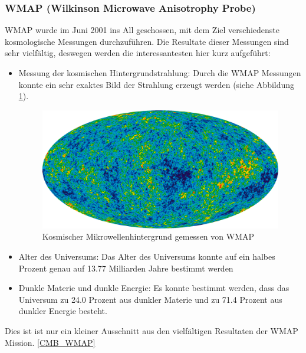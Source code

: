 \subsubsection{WMAP (Wilkinson Microwave Anisotrophy Probe)}
WMAP wurde im Juni 2001 ins All geschossen, mit dem Ziel verschiedenste 
kosmologische Messungen durchzuführen.
Die Resultate dieser Messungen sind sehr vielfältig, deswegen werden die 
interessantesten hier kurz aufgeführt:
\begin{itemize}
	\item Messung der kosmischen Hintergrundstrahlung: Durch die WMAP Messungen 
	konnte ein sehr exaktes Bild der Strahlung erzeugt werden (siehe Abbildung 
	\ref{fig:CMB_WMAP}).
	\begin{figure}
		\includegraphics[width=\linewidth]{cmb/images/CMB_WMAP.png}
		\caption{Kosmischer Mikrowellenhintergrund gemessen von WMAP}
		\label{fig:CMB_WMAP}
	\end{figure}
	\item Alter des Universums: Das Alter des Universums konnte auf ein halbes 
	Prozent genau auf 13.77 Milliarden Jahre bestimmt werden
	\item Dunkle Materie und dunkle Energie: Es konnte bestimmt werden, dass 
	das Universum zu 24.0 Prozent aus dunkler Materie und zu 71.4 Prozent aus 
	dunkler Energie besteht.
\end{itemize}
Dies ist ist nur ein kleiner Ausschnitt aus den vielfältigen Resultaten der 
WMAP Mission.
\ref{CMB_WMAP}

